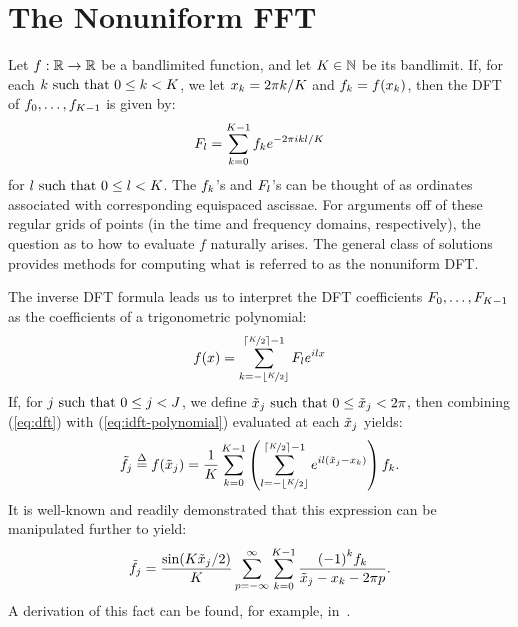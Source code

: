 \section{The Nonuniform FFT}

Let $f: \mathbb{R} \to \mathbb{R}$ be a bandlimited function, and let
$K{} \in \mathbb{N}$ be its bandlimit. If, for each
$k{} \mbox{ such that } 0 \leq k{} < K{}$, we
let ${x}_{k{}} = 2\pi{}k{}/K{}$ and
${f}_{k{}} = f({x}_{k{}})$, then
the DFT of ${f}_{0}, \hdots, {f}_{K{} - 1}$ is given
by:
\begin{align}\label{eq:dft}
  {F}_{l{}} = \sum_{{k{}}=0}^{K{}-1} {f}_{k{}} e^{-2\pi{}ik{}l{}/K{}}
\end{align}
for $l{} \mbox{ such that } 0 \leq l{} <
K{}$. The ${f}_{k{}}$'s and
${F}_{l{}}$'s can be thought of as ordinates
associated with corresponding equispaced ascissae. For arguments off
of these regular grids of points (in the time and frequency domains,
respectively), the question as to how to evaluate $f$ naturally
arises. The general class of solutions provides methods for computing
what is referred to as the nonuniform DFT.\@

The inverse DFT formula leads us to interpret the DFT coefficients
${F}_{0}, \hdots, {F}_{K{}-1}$ as the coefficients of
a trigonometric polynomial:
\begin{align}\label{eq:idft-polynomial}
  f(x) = \sum_{{k{}}=-\left\lfloor\nicefrac{K}{2}\right\rfloor}^{\left\lceil\nicefrac{K}{2}\right\rceil{}-1} {F}_{l{}} e^{il{}x}
\end{align}
If, for $j{} \mbox{ such that } 0 \leq j{} < J{}$, we define
${\tilde{x}}_{j{}} \mbox{ such that } 0 \leq {\tilde{x}}_{j{}} < 2\pi$, then combining
(\ref{eq:dft}) with (\ref{eq:idft-polynomial}) evaluated at each
${\tilde{x}}_{j{}}$ yields:
\begin{align}\label{eq:first-interpolation}
  {\tilde{f}}_{j{}} \overset{\Delta}{=} f({\tilde{x}}_{j{}}) = \frac{1}{K{}} \sum_{{k{}}=0}^{K{}-1} \left(\sum_{{l{}}=-\left\lfloor\nicefrac{K}{2}\right\rfloor}^{\left\lceil\nicefrac{K}{2}\right\rceil{}-1} e^{il{}({\tilde{x}}_{j{}} - {x}_{k{}})}\right) {f}_{k{}}.
\end{align}
It is well-known and readily demonstrated that this expression can be
manipulated further to yield:
\begin{align}\label{eq:per-interp-cot-kernel}
  {\tilde{f}}_{j{}} = \frac{\sin(K{}{\tilde{x}}_{j{}}/2)}{K{}} \sum_{p{}=-\infty}^\infty \sum_{{k{}}=0}^{K{}-1} \frac{{(-1)}^{k{}}{f}_{k{}}}{{\tilde{x}}_{j{}} - {x}_{k{}} - 2\pi{}p{}}.
\end{align}
A derivation of this fact can be found, for example,
in~\cite{sinc-interpolation, Dutt95fastfourierII}.

